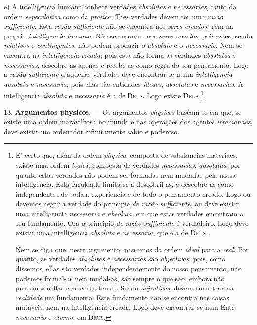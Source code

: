 e) A intelligencia humana conhece verdades \emph{absolutas} e \emph{necessarias}, tanto da ordem \emph{especulativa} como da \emph{pratica}. Taes verdades devem ter uma \emph{razão sufficiente}. Esta \emph{razão sufficiente} não se encontra nos \emph{seres creados}, nem na propria \emph{intelligencia humana}. Não se encontra nos \emph{seres creados}; pois estes, sendo \emph{relativos} e \emph{contingentes}, não podem produzir o \emph{absoluto} e o \emph{necessario}. Nem se encontra na \emph{intelligencia creada}; pois esta não forma as verdades \emph{absolutas} e \emph{necessarias}, descobre-as apenas e recebe-as como regra do seu pensamento. Logo a \emph{razão sufficiente} d'aquellas verdades deve encontrar-se numa \emph{intelligencia absoluta} e \emph{necessaria}; pois ellas são entidades \emph{ideaes}, \emph{absolutas} e \emph{necessarias}. A intelligencia \emph{absoluta} e \emph{necessaria} é a de \textsc{Deus}. Logo existe \textsc{Deus} \footnote{E' certo que, além da ordem \emph{physica}, composta de substancias materiaes, existe uma ordem \emph{logica}, composta de verdades \emph{necessarias}, \emph{absolutas}; por quanto estas verdades não podem ser formadas nem mudadas pela nossa intelligencia. Esta faculdade limita-se a descobril-as, e descobre-as como independentes de toda a experiencia e de todo o pensamento creado. Logo ou devemos negar a verdade do principio \emph{de razão sufficiente}, ou deve existir uma intelligencia \emph{necessaria} e \emph{absoluta}, em que estas verdades encontram o seu fundamento. Ora o principio \emph{de razão sufficiente} é verdadeiro. Logo deve existir uma intelligencia \emph{absoluta} e \emph{necessaria}, que é a de \textsc{Deus}.\par Nem se diga que, neste argumento, passamos da ordem \emph{ideal} para a \emph{real}. Por quanto, as verdades \emph{absolutas} e \emph{necessarias} são \emph{objectivas}; pois, como dissemos, ellas são verdades independentemente do nosso pensamento, não podemos formal-as nem mudal-as, são sempre o que são, embora não pensemos nellas e as contestemos. Sendo \emph{objectivas}, devem encontrar na \emph{realidade} um fundamento. Este fundamento não se encontra nas coisas mutaveis, nem na intelligencia creada. Logo deve encontrar-se num Ente \emph{necessario} e \emph{eterno}, em \textsc{Deus}.}.

13. \textbf{Argumentos physicos}. --- Os argumentos \emph{physicos} basêam-se em que, se existe uma ordem maravilhosa no mundo e nas operações dos agentes \emph{irracionaes}, deve existir um ordenador infinitamente sabio e poderoso.

